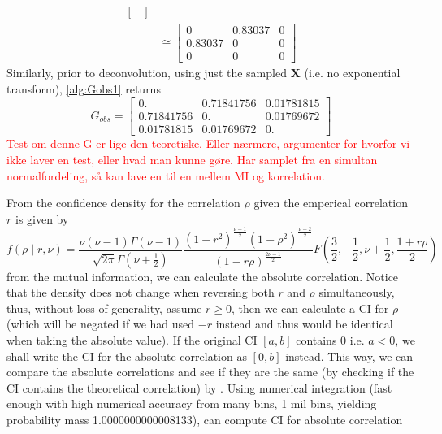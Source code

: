 \documentclass[../Thesis.tex]{subfiles}
\begin{document}
\begin{example}
\begin{align*}
\begin{bmatrix}
        \end{bmatrix} \\
                & \cong
        \begin{bmatrix}
            0       & 0.83037 & 0 \\
            0.83037 & 0       & 0 \\
            0       & 0       & 0
        \end{bmatrix}
    \end{align*}
    Similarly, prior to deconvolution, using just the sampled $\boldsymbol X$ (i.e. no exponential transform), \autoref{alg:Gobs1} returns
    $$G_{obs} =
        \begin{bmatrix}
            0.         & 0.71841756 & 0.01781815 \\
            0.71841756 & 0.         & 0.01769672 \\
            0.01781815 & 0.01769672 & 0.
        \end{bmatrix}
    $$
    \textcolor{red}{Test om denne G er lige den teoretiske. Eller nærmere, argumenter for hvorfor vi ikke laver en test, eller hvad man kunne gøre. Har samplet fra en simultan normalfordeling, så kan lave en til en mellem MI og korrelation. }

    From the confidence density for the correlation $\rho$ given the emperical correlation $r$ is given by
    $$f\left(\rho \mid r,\nu\right) = \frac{\nu (\nu-1) \Gamma(\nu-1)}{\sqrt{2\pi} \Gamma(\nu + \frac{1}{2})} \frac{\left(1-r^2\right)^{\frac{\nu-1}{2}} \left(1-\rho^2\right)^{\frac{\nu-2}{2}} }{\left(1-r\rho\right)^{\frac{2\nu-1}{2}}} F\left(\frac{3}{2}, -\frac{1}{2}, \nu+\frac{1}{2}, \frac{1+r\rho}{2}\right)$$
    from the mutual information, we can calculate the absolute correlation. Notice that the density does not change when reversing both $r$ and $\rho$ simultaneously, thus, without loss of generality, assume $r\geq 0$, then we can calculate a CI for $\rho$ (which will be negated if we had used $-r$ instead and thus would be identical when taking the absolute value). If the original CI $[a,b]$ contains $0$ i.e. $a<0$, we shall write the CI for the absolute correlation as $[0,b]$ instead. This way, we can compare the absolute correlations and see if they are the same (by checking if the CI contains the theoretical correlation) by \cite{Confidence-in-Correlation}. Using numerical integration (fast enough with high numerical accuracy from many bins, 1 mil bins, yielding probability mass 1.0000000000008133), can compute CI for absolute correlation


\end{example}
\end{document}
